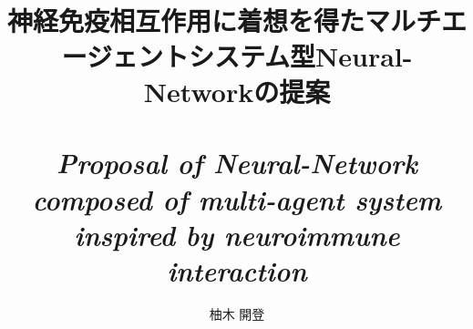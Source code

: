 \documentclass[10.5pt,a4j,dvipdfmx,openany]{jsbook}

\usepackage{algpseudocode}
\usepackage{algorithm}
\usepackage{wallpaper}
\usepackage{listings,jvlisting} 
\renewcommand{\figurename}{Fig. }
\renewcommand{\tablename}{Tab. }
\makeatletter
\renewcommand{\ALG@name}{Algorithm.}
\makeatother
\title{\LARGE{}\\\mbox{}\\
  神経免疫相互作用に着想を得たマルチエージェントシステム型Neural-Networkの提案\\ \mbox{}\\
\textit{Proposal of Neural-Network composed of multi-agent system inspired by neuroimmune interaction}}
\author{柚木 開登}


\maketitle

\tableofcontents
\listoftables
\listoffigures
\clearpage
\section*{あらまし}
